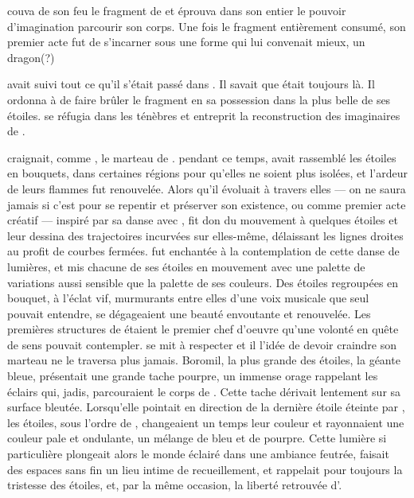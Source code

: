 \Ogo couva de son feu le fragment de \Drisst et éprouva dans son entier le pouvoir d'imagination parcourir son corps. Une fois le fragment entièrement consumé, son premier acte fut de s'incarner sous une forme qui lui convenait mieux, un dragon(?)


\Cind avait suivi tout ce qu'il s'était passé dans \Dreyma. Il savait que \Ogo était toujours là. Il ordonna à \Carac de faire brûler le fragment en sa possession dans la plus belle de ses étoiles. \Shuru se réfugia dans les ténèbres et entreprit la reconstruction des imaginaires de \Mey. 

\Ogo craignait, comme \Shuru, le marteau de \Carac. \Carac pendant ce temps, avait rassemblé les étoiles en bouquets, dans certaines régions pour qu'elles ne soient plus isolées, et l'ardeur de leurs flammes fut renouvelée. Alors qu'il évoluait à travers elles --- on ne saura jamais si c'est pour se repentir et préserver son existence, ou comme premier acte créatif --- inspiré par sa danse avec \Drisst, \Ogo fit don du mouvement à quelques étoiles et leur dessina des trajectoires incurvées sur elles-même, délaissant les lignes droites au profit de courbes fermées. \Carac fut enchantée à la contemplation de cette danse de lumières, et mis chacune de ses étoiles en mouvement avec une palette de variations aussi sensible que la palette de ses couleurs. Des étoiles regroupées en bouquet, à l'éclat vif, murmurants entre elles d'une voix musicale que seul \Carac pouvait entendre, se dégageaient une beauté envoutante et renouvelée. Les premières structures de \Dreyma étaient le premier chef d'oeuvre qu'une volonté en quête de sens pouvait contempler. \Ogo se mit à respecter \Carac et il l'idée de devoir craindre son marteau ne le traversa plus jamais. Boromil, la plus grande des étoiles, la géante bleue, présentait une grande tache pourpre, un immense orage rappelant les éclairs qui, jadis, parcouraient le corps de \Boromu. Cette tache dérivait lentement sur sa surface bleutée. Lorsqu'elle pointait en direction de la dernière étoile éteinte par \Shuru, les étoiles, sous l'ordre de \Carac, changeaient un temps leur couleur et rayonnaient une couleur pale et ondulante, un mélange de bleu et de pourpre. Cette lumière si particulière plongeait alors le monde éclairé dans une ambiance feutrée, faisait des espaces sans fin un lieu intime de recueillement, et rappelait pour toujours la tristesse des étoiles, et, par la même occasion, la liberté retrouvée d'\Ogo.